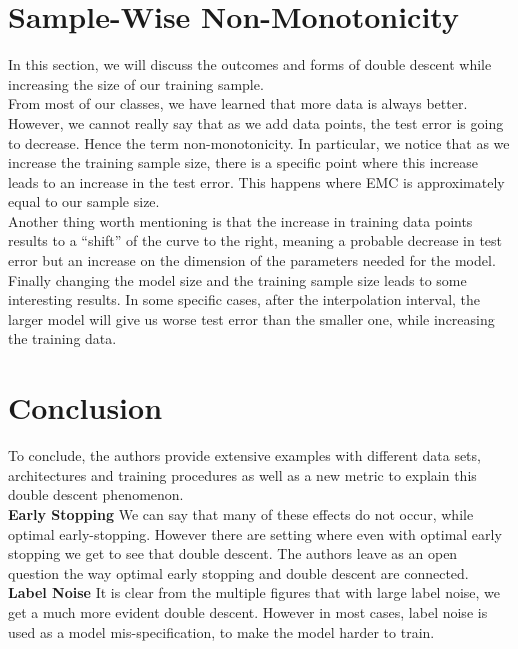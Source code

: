 \documentclass[]{article}
\begin{document}
\section{Sample-Wise Non-Monotonicity}

In this section, we will discuss the outcomes and forms of double descent while increasing the size of our training sample. \\

From most of our classes, we have learned that more data is always better. However, we cannot really say that as we add data points, the test error is going to decrease. Hence the term non-monotonicity. In particular, we notice that as we increase the training sample size, there is a specific point where this increase leads to an increase in the test error. This happens where EMC is approximately equal to our sample size.\\

Another thing worth mentioning is that the increase in training data points results to a “shift” of the curve to the right, meaning a probable decrease in test error but an increase on the dimension of the parameters needed for the model. \\

Finally changing the model size and the training sample size leads to some interesting results. In some specific cases, after the interpolation interval, the larger model will give us worse test error than the smaller one, while increasing the training data. \\

\section{Conclusion}

To conclude, the authors provide extensive examples with different data sets, architectures and training procedures as well as a new metric to explain this double descent phenomenon. \\

\textbf{Early Stopping} We can say that many of these effects do not occur, while optimal early-stopping. However there are setting where even with optimal early stopping we get to see that double descent. The authors leave as an open question the way optimal early stopping and double descent are connected. \\

\textbf{Label Noise} It is clear from the multiple figures that with large label noise, we get a much more evident double descent. However in most cases, label noise is used as a model mis-specification, to make the model harder to train. \\
\end{document}
